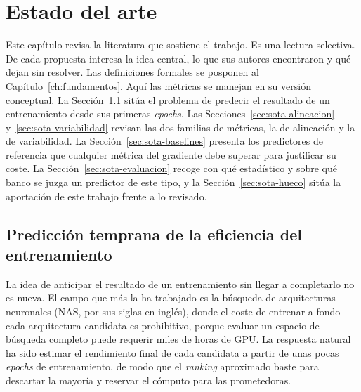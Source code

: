 \chapter{Estado del arte}
\label{ch:estado-del-arte}

Este capítulo revisa la literatura que sostiene el trabajo. Es una lectura selectiva. De cada propuesta interesa la idea central, lo que sus autores encontraron y qué dejan sin resolver. Las definiciones formales se posponen al Capítulo~\ref{ch:fundamentos}. Aquí las métricas se manejan en su versión conceptual. La Sección~\ref{sec:eda-prediccion} sitúa el problema de predecir el resultado de un entrenamiento desde sus primeras \emph{epochs}. Las Secciones~\ref{sec:sota-alineacion} y~\ref{sec:sota-variabilidad} revisan las dos familias de métricas, la de alineación y la de variabilidad. La Sección~\ref{sec:sota-baselines} presenta los predictores de referencia que cualquier métrica del gradiente debe superar para justificar su coste. La Sección~\ref{sec:sota-evaluacion} recoge con qué estadístico y sobre qué banco se juzga un predictor de este tipo, y la Sección~\ref{sec:sota-hueco} sitúa la aportación de este trabajo frente a lo revisado.

\section{Predicción temprana de la eficiencia del entrenamiento}
\label{sec:eda-prediccion}

La idea de anticipar el resultado de un entrenamiento sin llegar a completarlo no es nueva. El campo que más la ha trabajado es la búsqueda de arquitecturas neuronales (NAS, por sus siglas en inglés), donde el coste de entrenar a fondo cada arquitectura candidata es prohibitivo, porque evaluar un espacio de búsqueda completo puede requerir miles de horas de GPU. La respuesta natural ha sido estimar el rendimiento final de cada candidata a partir de unas pocas \emph{epochs} de entrenamiento, de modo que el \emph{ranking} aproximado baste para descartar la mayoría y reservar el cómputo para las prometedoras.

